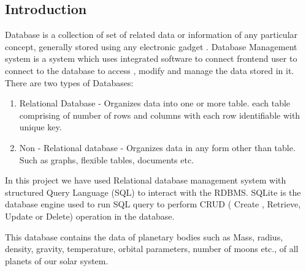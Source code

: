\subsection{Introduction}
Database is a collection of set of related data or information of any particular concept, generally stored using any electronic gadget . Database Management system is a system which uses integrated software to connect frontend user to connect to the database to access , modify and manage the data stored in it.  
There are two types of Databases:
\begin{enumerate}
\item Relational Database - Organizes data into one or more table. each table comprising of number of rows and columns  with each row identifiable with unique key.
\item Non - Relational database - Organizes data in any form other than table. Such as graphs, flexible tables, documents etc.
\end{enumerate}
In this project we have used Relational database management system with structured Query Language (SQL) to interact with the RDBMS. SQLite is the database engine used to run SQL query to perform CRUD ( Create , Retrieve, Update or Delete) operation in the database.

This database contains the data of planetary bodies such as Mass, radius, density, gravity, temperature, orbital parameters, number of moons etc., of all planets of our solar system.